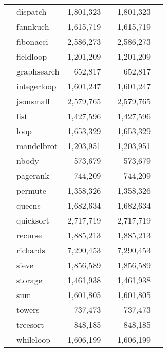 \begin{tabular}{ll@{\hspace{6pt}}r@{\hspace{3pt}}l@{\hspace{6pt}}r@{\hspace{3pt}}l}
 & dispatch & 1,801,323 &  & 1,801,323 &  \\
 & fannkuch & 1,615,719 &  & 1,615,719 &  \\
 & fibonacci & 2,586,273 &  & 2,586,273 &  \\
 & fieldloop & 1,201,209 &  & 1,201,209 &  \\
 & graphsearch & 652,817 &  & 652,817 &  \\
 & integerloop & 1,601,247 &  & 1,601,247 &  \\
 & jsonsmall & 2,579,765 &  & 2,579,765 &  \\
 & list & 1,427,596 &  & 1,427,596 &  \\
 & loop & 1,653,329 &  & 1,653,329 &  \\
 & mandelbrot & 1,203,951 &  & 1,203,951 &  \\
 & nbody & 573,679 &  & 573,679 &  \\
 & pagerank & 744,209 &  & 744,209 &  \\
 & permute & 1,358,326 &  & 1,358,326 &  \\
 & queens & 1,682,634 &  & 1,682,634 &  \\
 & quicksort & 2,717,719 &  & 2,717,719 &  \\
 & recurse & 1,885,213 &  & 1,885,213 &  \\
 & richards & 7,290,453 &  & 7,290,453 &  \\
 & sieve & 1,856,589 &  & 1,856,589 &  \\
 & storage & 1,461,938 &  & 1,461,938 &  \\
 & sum & 1,601,805 &  & 1,601,805 &  \\
 & towers & 737,473 &  & 737,473 &  \\
 & treesort & 848,185 &  & 848,185 &  \\
 & whileloop & 1,606,199 &  & 1,606,199 &  \\
\bottomrule
\end{tabular}